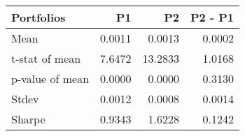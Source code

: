 \begin{tabular}{lrrr}
\toprule
Portfolios & P1 & P2 & P2 - P1 \\
\midrule
Mean & 0.0011 & 0.0013 & 0.0002 \\
t-stat of mean & 7.6472 & 13.2833 & 1.0168 \\
p-value of mean & 0.0000 & 0.0000 & 0.3130 \\
Stdev & 0.0012 & 0.0008 & 0.0014 \\
Sharpe & 0.9343 & 1.6228 & 0.1242 \\
\bottomrule
\end{tabular}
